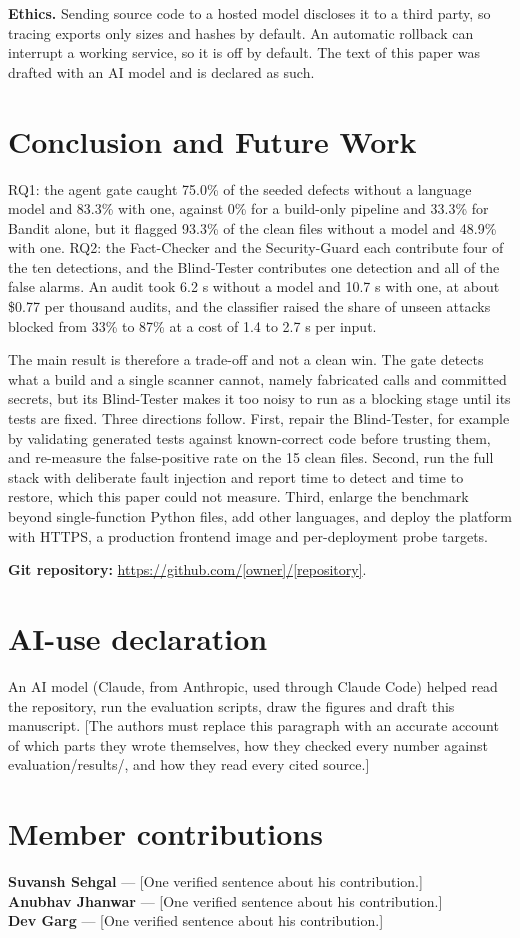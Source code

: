 \documentclass[12pt,onecolumn,draftclsnofoot]{IEEEtran}
\begin{document}
\textbf{Ethics.} Sending source code to a hosted model discloses it to a third party, so tracing exports only sizes and hashes by default. An automatic rollback can interrupt a working service, so it is off by default. The text of this paper was drafted with an AI model and is declared as such.

\section{Conclusion and Future Work}
RQ1: the agent gate caught 75.0\% of the seeded defects without a language model and 83.3\% with one, against 0\% for a build-only pipeline and 33.3\% for Bandit alone, but it flagged 93.3\% of the clean files without a model and 48.9\% with one. RQ2: the Fact-Checker and the Security-Guard each contribute four of the ten detections, and the Blind-Tester contributes one detection and all of the false alarms. An audit took 6.2 s without a model and 10.7 s with one, at about \$0.77 per thousand audits, and the classifier raised the share of unseen attacks blocked from 33\% to 87\% at a cost of 1.4 to 2.7 s per input.

The main result is therefore a trade-off and not a clean win. The gate detects what a build and a single scanner cannot, namely fabricated calls and committed secrets, but its Blind-Tester makes it too noisy to run as a blocking stage until its tests are fixed. Three directions follow. First, repair the Blind-Tester, for example by validating generated tests against known-correct code before trusting them, and re-measure the false-positive rate on the 15 clean files. Second, run the full stack with deliberate fault injection and report time to detect and time to restore, which this paper could not measure. Third, enlarge the benchmark beyond single-function Python files, add other languages, and deploy the platform with HTTPS, a production frontend image and per-deployment probe targets.

\noindent\textbf{Git repository:} \url{https://github.com/[owner]/[repository]}.

\section*{AI-use declaration}
An AI model (Claude, from Anthropic, used through Claude Code) helped read the repository, run the evaluation scripts, draw the figures and draft this manuscript. [The authors must replace this paragraph with an accurate account of which parts they wrote themselves, how they checked every number against evaluation/results/, and how they read every cited source.]

\section*{Member contributions}
\noindent\textbf{Suvansh Sehgal} --- [One verified sentence about his contribution.]\\
\textbf{Anubhav Jhanwar} --- [One verified sentence about his contribution.]\\
\textbf{Dev Garg} --- [One verified sentence about his contribution.]



\end{document}

